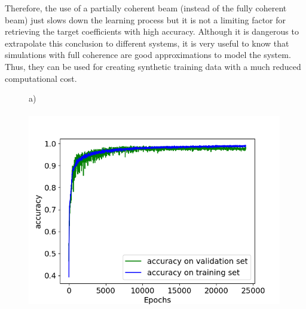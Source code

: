 \documentclass{iucr}
\begin{document}
Therefore, the use of a partially coherent beam (instead of the fully coherent beam) just slows down the learning process but it is not a limiting factor for retrieving the target coefficients with high accuracy. Although it is dangerous to extrapolate this conclusion to different systems, it is very useful to know that simulations with full coherence are good approximations to model the system. Thus, they can be used for creating synthetic training data with a much reduced computational cost. 

 
\begin{figure}\label{fig:multimode}
    a)~~~~~~~~~~~~~~~~~~~~~~~~~~~~~~~~~~~~~~~~~~~~~~~~~~~~~~~~~~~~~~~~~~~~~~~~~~~~~~~\\
    \includegraphics[width=0.99\textwidth]{figures/v23.png}
    

\end{figure}
\end{document}
